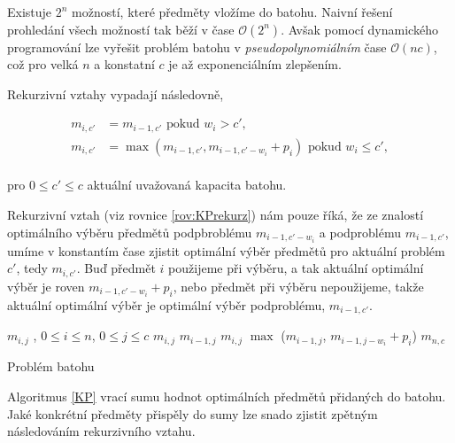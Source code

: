 Existuje $2^n$ možností, které předměty vložíme do batohu. Naivní řešení prohledání všech možností tak běží v čase $\mathcal{O} (2^n)$.
Avšak pomocí dynamického programování lze vyřešit problém batohu v \textit{pseudopolynomiálním} čase $\mathcal{O}(nc)$,
což pro velká $n$ a konstatní $c$ je až exponenciálním zlepšením.

Rekurzivní vztahy vypadají následovně,

\begin{definice}\label{rov:KPrekurz}
  \begin{align}
    m_{i, c'} &= m_{i - 1, c'} \text{ pokud } w_i > c', \\
    m_{i, c'} &= \max (m_{i - 1, c'}, m_{i - 1, c' - w_i} + p_i) \text{ pokud } w_i \leq c',
  \end{align}
  \\
  pro $0 \leq c' \leq c$ aktuální uvažovaná kapacita batohu.
\end{definice}

Rekurzivní vztah (viz rovnice \ref{rov:KPrekurz}) nám pouze říká, že ze znalostí optimálního výběru předmětů podpbroblému $m_{i-1, c' - w_i}$ a podproblému $m_{i - 1, c'}$,
umíme v konstantím čase zjistit optimální výběr předmětů pro aktuální problém $c'$, tedy $m_{i, c'}$.
Buď předmět $i$ použijeme při výběru, a tak aktuální optimální výběr je roven $m_{i - 1, c' - w_i} + p_i$,
nebo předmět při výběru nepoužijeme, takže aktuální optimální výběr je optimální výběr podproblému, $m_{i - 1, c'}$. 

\begin{algorithm}[h]
  \begin{algorithmic}[1]
    \State $m_{i, j}$ , $0 \leq i \leq n$, $0 \leq j \leq c$
          \State $m_{i, j}$ \gets $m_{i - 1, j}$
        \Else
          \State $m_{i, j}$ \gets $\max$ ($m_{i - 1, j}$, $m_{i - 1, j - w_i} + p_i$)
        \EndIf
      \EndFor
    \EndFor
    \State \Return $m_{n,c}$
  \EndFunction
  \end{algorithmic}
  \caption{Problém batohu}
  \label{KP}
\end{algorithm}

Algoritmus \ref{KP} vrací sumu hodnot optimálních předmětů přidaných do batohu.
Jaké konkrétní předměty přispěly do sumy lze snado zjistit zpětným následováním rekurzivního vztahu.

